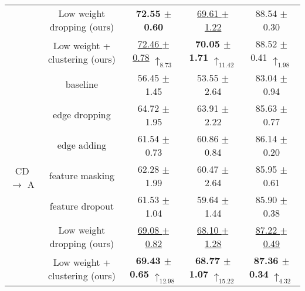 \begin{table*}[ht]
{\begin{tabular}{c|c|ccc}
&  Low weight dropping (ours) & \textbf{ 72.55 $\pm$ 0.60} & \underline{69.61 $\pm$ 1.22} & 88.54 $\pm$ 0.30  \\
&  Low weight + clustering (ours)     & \underline{72.46 $\pm$ 0.78} $\uparrow_{8.73}$ & \textbf{70.05 $\pm$ 1.71} $\uparrow_{11.42}$ & 88.52 $\pm$ 0.41 $\uparrow_{1.98}$     
  \\  
    \hline
  \multirow{7}{*}{CD $\to$ A}                       
&  baseline   &   56.45 $\pm$ 1.45 & 53.55 $\pm$ 2.64 & 83.04 $\pm$ 0.94                               
 \\                                            
& edge dropping &      64.72 $\pm$ 1.95 & 63.91 $\pm$ 2.22 & 85.63 $\pm$ 0.77                  
  \\                                           
 & edge adding  &  61.54 $\pm$ 0.73 & 60.86 $\pm$ 0.84 & 86.14 $\pm$ 0.20                        
 \\                                            
& feature masking &  62.28 $\pm$ 1.99 & 60.47 $\pm$ 2.64 & 85.95 $\pm$ 0.61                          
  \\                                           
 & feature dropout &    61.53 $\pm$ 1.04 & 59.64 $\pm$ 1.44 & 85.90 $\pm$ 0.38                        
  \\                                           
&  Low weight dropping (ours) &      \underline{69.08 $\pm$ 0.82} & \underline{68.10 $\pm$ 1.28} & \underline{87.22 $\pm$ 0.49}           
  \\  
& Low weight + clustering (ours) & \textbf{69.43 $\pm$ 0.65} $\uparrow_{12.98}$ & \textbf{68.77 $\pm$ 1.07} $\uparrow_{15.22}$ & \textbf{87.36 $\pm$ 0.34} $\uparrow_{4.32}$\\
\bottomrule
    \end{tabular}
    }
    \label{tab:tab:augmentation_GIN_all}    
\end{table*}
